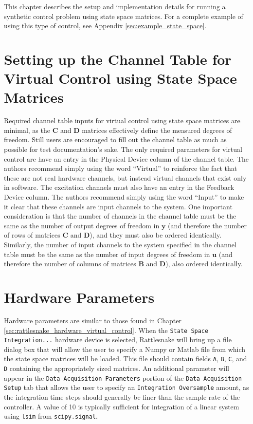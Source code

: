 \documentclass[pdf,12pt,report]{SANDreport}
\newcommand{\inlineCode}{\lstinline[basicstyle=\bfseries\ttfamily]}
\begin{document}
    This chapter describes the setup and implementation details for running a synthetic control problem using state space matrices.  For a complete example of using this type of control, see Appendix \ref{sec:example_state_space}.
    
    \section{Setting up the Channel Table for Virtual Control using State Space Matrices}
    Required channel table inputs for virtual control using state space matrices are minimal, as the $\mathbf{C}$ and $\mathbf{D}$ matrices effectively define the measured degrees of freedom.  Still users are encouraged to fill out the channel table as much as possible for test documentation's sake.  The only required parameters for virtual control are have an entry in the Physical Device column of the channel table.  The authors recommend simply using the word ``Virtual'' to reinforce the fact that these are not real hardware channels, but instead virtual channels that exist only in software.  The excitation channels must also have an entry in the Feedback Device column.  The authors recommend simply using the word ``Input'' to make it clear that these channels are input channels to the system.  One important consideration is that the number of channels in the channel table must be the same as the number of output degrees of freedom in $\mathbf{y}$ (and therefore the number of rows of matrices $\mathbf{C}$ and $\mathbf{D}$), and they must also be ordered identically.  Similarly, the number of input channels to the system specified in the channel table must be the same as the number of input degrees of freedom in $\mathbf{u}$ (and therefore the number of columns of matrices $\mathbf{B}$ and $\mathbf{D}$), also ordered identically.
    
    \section{Hardware Parameters}
    Hardware parameters are similar to those found in Chapter \ref{sec:rattlesnake_hardware_virtual_control}.  When the \inlineCode{State Space Integration...} hardware device is selected, Rattlesnake will bring up a file dialog box that will allow the user to specify a Numpy or Matlab file from which the state space matrices will be loaded.  This file should contain fields \inlineCode{A}, \inlineCode{B}, \inlineCode{C}, and \inlineCode{D} containing the appropriately sized matrices.  An additional parameter will appear in the \inlineCode{Data Acquisition Parameters} portion of the \inlineCode{Data Acquisition Setup} tab that allows the user to specify an \inlineCode{Integration Oversample} amount, as the integration time steps should generally be finer than the sample rate of the controller.  A value of 10 is typically sufficient for integration of a linear system using \inlineCode{lsim} from \inlineCode{scipy.signal}.
    
\end{document}
